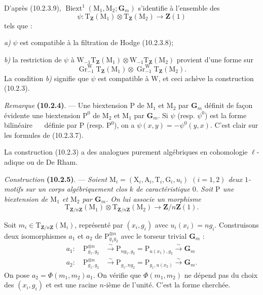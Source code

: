 \documentclass[11pt,leqno]{article}
\newcommand{\Page}[1]{\ifvmode\noindent\else\unskip\ \fi{\footnotesize\textcolor{gray}{[p.\,#1]}}\ \ignorespaces}
\begin{document}
D’après (10.2.3.9),
\(\operatorname{Biext}^{1}(\mathrm{M}_1,\mathrm{M}_2;\mathbf{G}_m)\)
s’identifie à l’ensemble des
\[
\psi:\mathrm{T}_{\mathbf{Z}}(\mathrm{M}_1)\otimes
\mathrm{T}_{\mathbf{Z}}(\mathrm{M}_2)\to\mathbf{Z}(1)
\]
tels que :

\noindent\textit{a)} \(\psi\) est compatible à la filtration de
Hodge (10.2.3.8);

\noindent\textit{b)} la restriction de \(\psi\) à
\(\mathrm{W}_{-1}\mathrm{T}_{\mathbf{Z}}(\mathrm{M}_1)\otimes
\mathrm{W}_{-1}\mathrm{T}_{\mathbf{Z}}(\mathrm{M}_2)\)
provient d’une forme sur
\[
\operatorname{Gr}^{\mathrm{W}}_{-1}
\mathrm{T}_{\mathbf{Z}}(\mathrm{M}_1)\otimes
\operatorname{Gr}^{\mathrm{W}}_{-1}
\mathrm{T}_{\mathbf{Z}}(\mathrm{M}_2).
\]
La condition \textit{b)} signifie que \(\psi\) est compatible à
\(\mathrm{W}\), et ceci achève la construction (10.2.3).

\textit{Remarque} \textbf{(10.2.4)}. — Une biextension
\(\mathrm{P}\) de \(\mathrm{M}_1\) et \(\mathrm{M}_2\) par
\(\mathbf{G}_m\) définit de façon évidente une biextension
\(\mathrm{P}^{0}\) de \(\mathrm{M}_2\) et \(\mathrm{M}_1\) par
\(\mathbf{G}_m\). Si \(\psi\) (resp. \(\psi^{0}\)) est la forme
bilinéaire
\Page{64}
définie par \(\mathrm{P}\) (resp. \(\mathrm{P}^{0}\)), on a
\(\psi(x,y)=-\psi^{0}(y,x)\). C’est clair sur les formules de
(10.2.3.7).

La construction (10.2.3) a des analogues purement algébriques en
cohomologie \(\ell\)-adique ou de De Rham.

\textit{Construction} \textbf{(10.2.5)}. — \textit{Soient
\(\mathrm{M}_i=(\mathrm{X}_i,\mathrm{A}_i,\mathrm{T}_i,\mathrm{G}_i,u_i)\)
\((i=1,2)\) deux \(1\)-motifs sur un corps algébriquement clos
\(k\) de caractéristique \(0\). Soit \(\mathrm{P}\) une biextension
de \(\mathrm{M}_1\) et \(\mathrm{M}_2\) par \(\mathbf{G}_m\).
On lui associe un morphisme}
\[
\mathrm{T}_{\mathbf{Z}/n\mathbf{Z}}(\mathrm{M}_1)\otimes
\mathrm{T}_{\mathbf{Z}/n\mathbf{Z}}(\mathrm{M}_2)
\to\mathbf{Z}/n\mathbf{Z}(1).
\]

Soit \(m_i\in\mathrm{T}_{\mathbf{Z}/n\mathbf{Z}}(\mathrm{M}_i)\),
représenté par \((x_i,g_i)\) avec \(u_i(x_i)=ng_i\).
Construisons deux isomorphismes \(a_1\) et \(a_2\) de
\(\mathrm{P}_{g_1g_2}^{\otimes n}\) avec le torseur trivial
\(\mathbf{G}_m\) :
\[
\begin{aligned}
a_1:\quad
\mathrm{P}_{g_1,g_2}^{\otimes n}
&\xrightarrow{\sim}\mathrm{P}_{ng_1,g_2}
=\mathrm{P}_{u(x_1),g_2}\xrightarrow{\sim}\mathbf{G}_m\\
a_2:\quad
\mathrm{P}_{g_1,g_2}^{\otimes n}
&\xrightarrow{\sim}\mathrm{P}_{g_1,ng_2}
=\mathrm{P}_{g_1,u(x_2)}\xrightarrow{\sim}\mathbf{G}_m.
\end{aligned}
\]
On pose \(a_2=\Phi(m_1,m_2)a_1\). On vérifie que
\(\Phi(m_1,m_2)\) ne dépend pas du choix des \((x_i,g_i)\) et
est une racine \(n\)-ième de l’unité. C’est la forme cherchée.
\end{document}
